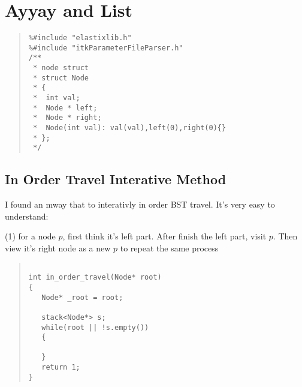 \chapter{Ayyay and List}\label{chp:BST}




\begin{quote}
\begin{verbatim}
%#include "elastixlib.h"
%#include "itkParameterFileParser.h"
/**
 * node struct
 * struct Node
 * {
 *  int val;
 *  Node * left;
 *  Node * right;
 *  Node(int val): val(val),left(0),right(0){}
 * };
 */
\end{verbatim}
\end{quote}


\section{In Order Travel Interative Method}

I found an mway that to interativly in order BST travel.
It's very easy to understand: 

(1) for a node $p$, first think it's left part.
After finish the left part, visit $p$. Then view it's right node as a new $p$ to repeat the same process


\begin{quote}
\begin{verbatim}

int in_order_travel(Node* root)
{
   Node* _root = root;
   
   stack<Node*> s;
   while(root || !s.empty())
   {
   
   }
   return 1;
}

\end{verbatim}
\end{quote}

